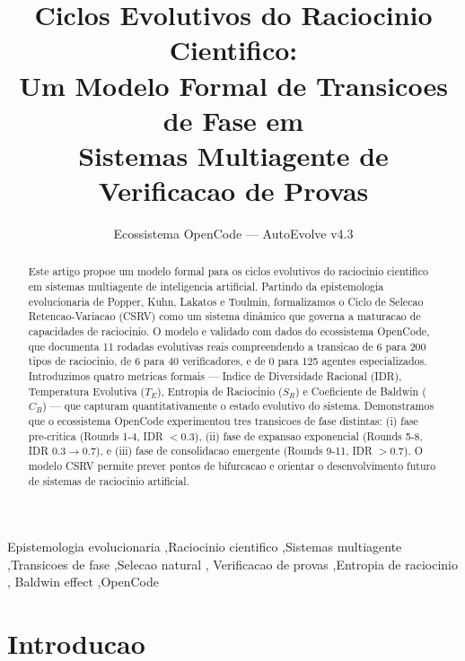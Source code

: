 \documentclass[5p]{elsarticle}
\begin{document}
\begin{frontmatter}
\title{\textbf{Ciclos Evolutivos do Raciocinio Cientifico:}\\
\large Um Modelo Formal de Transicoes de Fase em\\
Sistemas Multiagente de Verificacao de Provas}

\author[ufc]{Ecossistema OpenCode --- AutoEvolve v4.3}
\address[ufc]{Programa de Pos-Graduacao em Tecnologia da Informacao, Universidade Federal do Ceara, Fortaleza, CE, Brasil}

\begin{abstract}
Este artigo propoe um modelo formal para os ciclos evolutivos do raciocinio
cientifico em sistemas multiagente de inteligencia artificial. Partindo da
epistemologia evolucionaria de Popper, Kuhn, Lakatos e Toulmin, formalizamos
o Ciclo de Selecao Retencao-Variacao (CSRV) como um sistema dinâmico que
governa a maturacao de capacidades de raciocinio. O modelo e validado com
dados do ecossistema OpenCode, que documenta 11 rodadas evolutivas reais
compreendendo a transicao de 6 para 200 tipos de raciocinio, de 6 para 40
verificadores, e de 0 para 125 agentes especializados. Introduzimos quatro
metricas formais --- Indice de Diversidade Racional (IDR), Temperatura
Evolutiva ($T_E$), Entropia de Raciocinio ($S_R$) e Coeficiente de Baldwin
($C_B$) --- que capturam quantitativamente o estado evolutivo do sistema.
Demonstramos que o ecossistema OpenCode experimentou tres transicoes de fase
distintas: (i) fase pre-critica (Rounds 1-4, IDR $<0.3$), (ii) fase de
expansao exponencial (Rounds 5-8, IDR $0.3\to 0.7$), e (iii) fase de
consolidacao emergente (Rounds 9-11, IDR $>0.7$). O modelo CSRV permite
prever pontos de bifurcacao e orientar o desenvolvimento futuro de sistemas
de raciocinio artificial.
\end{abstract}

\begin{keyword}
Epistemologia evolucionaria \sep Raciocinio cientifico \sep Sistemas
multiagente \sep Transicoes de fase \sep Selecao natural \sep
Verificacao de provas \sep Entropia de raciocinio \sep
Baldwin effect \sep OpenCode
\end{keyword}
\end{frontmatter}

\tableofcontents
\newpage

\section{Introducao}
\end{document}
